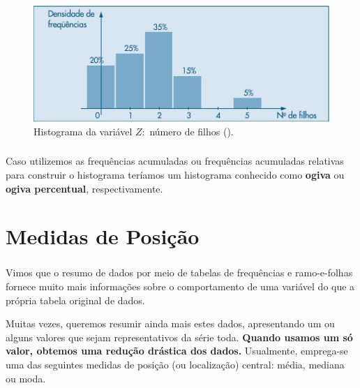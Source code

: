 \documentclass[14pt,aspectratio=1610]{beamer}
\begin{document}
\begin{frame}{}
\frametitle{}
\begin{block}{}
\justifying
\begin{figure}[H]
    \centering
    \includegraphics[scale=0.5]{Fig6}
    \caption{Histograma da variável $Z:$ número de filhos (\cite{Morettin09}).}
    \label{Fig6_ex}
  \end{figure}
\end{block}
\end{frame}


\begin{frame}{}
\frametitle{}
\begin{block}{}
\justifying
Caso utilizemos as frequências acumuladas ou frequências acumuladas relativas para construir o histograma teríamos um histograma conhecido como {\bf ogiva} ou {\bf ogiva percentual}, respectivamente.
\end{block}
\end{frame}

\section{Medidas de Posição}
\begin{frame}{}
\frametitle{}
\begin{block}{}
\justifying
Vimos que o resumo de dados por meio de tabelas de frequências e ramo-e-folhas fornece
muito mais informações sobre o comportamento de uma variável do que a própria tabela
original de dados. 
\end{block}
\pause
\begin{block}{}
\justifying
Muitas vezes, queremos resumir ainda mais estes dados, apresentando um ou alguns valores que sejam representativos da série toda. \textbf{Quando usamos um só 
valor, obtemos uma redução drástica dos dados.} Usualmente, emprega-se uma das seguintes medidas de posição (ou localização) central: média, mediana ou moda.
\end{block}
\end{frame}
\end{document}

